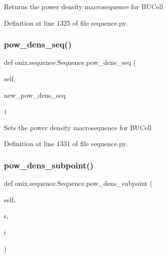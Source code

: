 \begin{DoxyVerb}Returns the power density macrosequence for BUCell
\end{DoxyVerb}
 

Definition at line 1325 of file sequence.\+py.

\mbox{\label{classonix_1_1sequence_1_1Sequence_aa357b20ca59aed435f2b17c4e88c0cb2}} 
\subsubsection{\texorpdfstring{pow\+\_\+dens\+\_\+seq()}{pow\_dens\_seq()}\hspace{0.1cm}{\footnotesize\ttfamily [2/2]}}
{\footnotesize\ttfamily def onix.\+sequence.\+Sequence.\+pow\+\_\+dens\+\_\+seq (\begin{DoxyParamCaption}\item[{}]{self,  }\item[{}]{new\+\_\+pow\+\_\+dens\+\_\+seq }\end{DoxyParamCaption})}

\begin{DoxyVerb}Sets the power density macrosequence for BUCell
\end{DoxyVerb}
 

Definition at line 1331 of file sequence.\+py.

\mbox{\label{classonix_1_1sequence_1_1Sequence_abee5c2f993c7b1a33cefffecfc9c264d}} 
\subsubsection{\texorpdfstring{pow\+\_\+dens\+\_\+subpoint()}{pow\_dens\_subpoint()}}
{\footnotesize\ttfamily def onix.\+sequence.\+Sequence.\+pow\+\_\+dens\+\_\+subpoint (\begin{DoxyParamCaption}\item[{}]{self,  }\item[{}]{s,  }\item[{}]{i }\end{DoxyParamCaption})}

